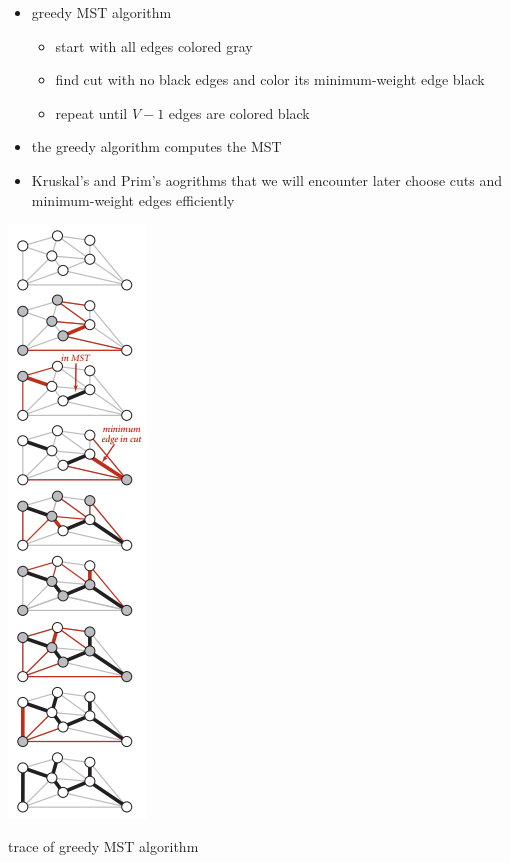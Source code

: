 \documentclass[8pt,a4paper,compress]{beamer}
\begin{document}
\begin{frame}[fragile]
\begin{minipage}{200pt}
\begin{itemize}
\item greedy MST algorithm
\begin{itemize}
\item start with all edges colored gray

\item find cut with no black edges and color its minimum-weight edge black

\item repeat until $V - 1$ edges are colored black
\end{itemize}

\item the greedy algorithm computes the MST

\item Kruskal's and Prim's aogrithms that we will encounter later choose cuts and minimum-weight edges efficiently
\end{itemize}
\end{minipage}%
\begin{minipage}{100pt}
\begin{center}
\includegraphics[scale=0.4]{./figures/mst3.png}

\smallskip

\tiny trace of greedy MST algorithm
\end{center}
\end{minipage}
\end{frame}
\end{document}
